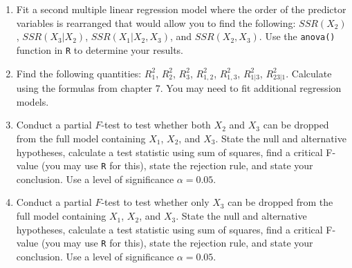 \documentclass[12pt]{article}
\newenvironment{problem}[2][Problem]{\begin{trivlist}
\item[\hskip \labelsep {\bfseries #1}\hskip \labelsep {\bfseries #2.}]}{\end{trivlist}}
\begin{document}
\begin{problem}{1}
\begin{enumerate}[label=(\alph*)]
\item Fit a second multiple linear regression model where the order of the predictor variables is rearranged that would allow you to find the following: \(SSR(X_2)\), \(SSR(X_3|X_2)\), \(SSR(X_1|X_2,X_3)\), and \(SSR(X_2,X_3)\). Use the \verb|anova()| function in \verb|R| to determine your results.
\item Find the following quantities: \(R_1^2\), \(R_2^2\), \(R_3^2\), \(R_{1,2}^2\), \(R_{1,3}^2\), \(R_{1|3}^2\), \(R_{23|1}^2\). Calculate using the formulas from chapter 7. You may need to fit additional regression models.
\item Conduct a partial \(F\)-test to test whether both \(X_2\) and \(X_3\) can be dropped from the full model containing \(X_1\), \(X_2\), and \(X_3\). State the null and alternative hypotheses, calculate a test statistic using sum of squares, find a critical F-value (you may use \verb|R| for this), state the rejection rule, and state your conclusion. Use a level of significance \(\alpha = 0.05\). 
\item Conduct a partial \(F\)-test to test whether only \(X_3\) can be dropped from the full model containing \(X_1\), \(X_2\), and \(X_3\). State the null and alternative hypotheses, calculate a test statistic using sum of squares, find a critical F-value (you may use \verb|R| for this), state the rejection rule, and state your conclusion. Use a level of significance \(\alpha = 0.05\). 
\end{enumerate}
\end{problem}
\end{document}
